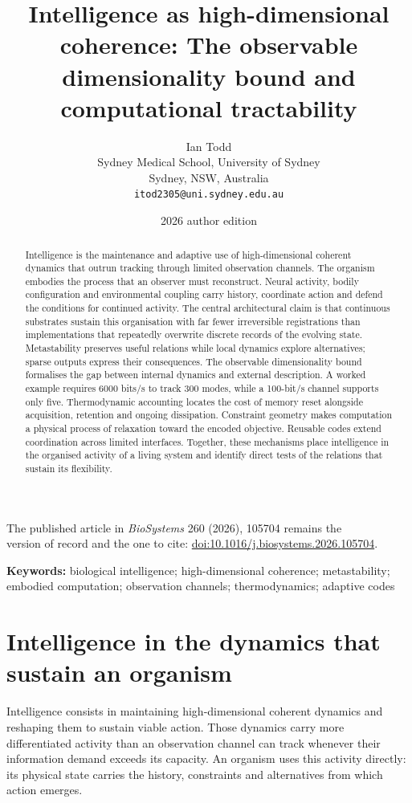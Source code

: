 \documentclass[11pt,a4paper]{article}
\title{Intelligence as high-dimensional coherence: The observable dimensionality bound and computational tractability}
\author{Ian Todd\\Sydney Medical School, University of Sydney\\Sydney, NSW, Australia\\
\texttt{itod2305@uni.sydney.edu.au}}
\date{2026 author edition}
\begin{document}
\maketitle
\begin{center}
\small The published article in \textit{BioSystems} 260 (2026), 105704 remains the\\
version of record and the one to cite:
\href{https://doi.org/10.1016/j.biosystems.2026.105704}{doi:10.1016/j.biosystems.2026.105704}.
\end{center}

\begin{abstract}
Intelligence is the maintenance and adaptive use of high-dimensional coherent dynamics that outrun tracking through limited observation channels. The organism embodies the process that an observer must reconstruct. Neural activity, bodily configuration and environmental coupling carry history, coordinate action and defend the conditions for continued activity. The central architectural claim is that continuous substrates sustain this organisation with far fewer irreversible registrations than implementations that repeatedly overwrite discrete records of the evolving state. Metastability preserves useful relations while local dynamics explore alternatives; sparse outputs express their consequences. The observable dimensionality bound formalises the gap between internal dynamics and external description. A worked example requires 6000 bits/s to track 300 modes, while a 100-bit/s channel supports only five. Thermodynamic accounting locates the cost of memory reset alongside acquisition, retention and ongoing dissipation. Constraint geometry makes computation a physical process of relaxation toward the encoded objective. Reusable codes extend coordination across limited interfaces. Together, these mechanisms place intelligence in the organised activity of a living system and identify direct tests of the relations that sustain its flexibility.
\end{abstract}

\noindent\textbf{Keywords:} biological intelligence; high-dimensional coherence; metastability; embodied computation; observation channels; thermodynamics; adaptive codes

\section{Intelligence in the dynamics that sustain an organism}

Intelligence consists in maintaining high-dimensional coherent dynamics and reshaping them to sustain viable action. Those dynamics carry more differentiated activity than an observation channel can track whenever their information demand exceeds its capacity. An organism uses this activity directly: its physical state carries the history, constraints and alternatives from which action emerges.
\end{document}
